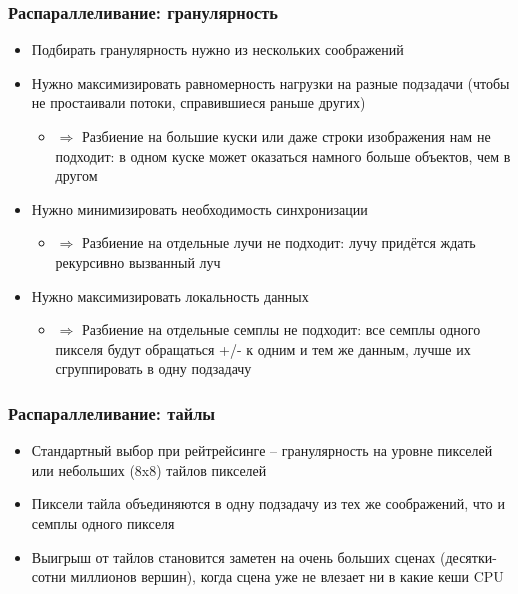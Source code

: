 \documentclass[10pt]{beamer}
\begin{document}
\begin{frame}[fragile]
\frametitle{Распараллеливание: гранулярность}
\begin{itemize}
\item Подбирать гранулярность нужно из нескольких соображений
\pause
\item Нужно максимизировать равномерность нагрузки на разные подзадачи (чтобы не простаивали потоки, справившиеся раньше других)
\pause
\begin{itemize}
\item \begin{math}\Longrightarrow\end{math} Разбиение на большие куски или даже строки изображения нам не подходит: в одном куске может оказаться намного больше объектов, чем в другом
\end{itemize}
\pause
\item Нужно минимизировать необходимость синхронизации
\pause
\begin{itemize}
\item \begin{math}\Longrightarrow\end{math} Разбиение на отдельные лучи не подходит: лучу придётся ждать рекурсивно вызванный луч
\end{itemize}
\pause
\item Нужно максимизировать локальность данных
\pause
\begin{itemize}
\item \begin{math}\Longrightarrow\end{math} Разбиение на отдельные семплы не подходит: все семплы одного пикселя будут обращаться +/- к одним и тем же данным, лучше их сгруппировать в одну подзадачу
\end{itemize}
\end{itemize}
\end{frame}

\begin{frame}[fragile]
\frametitle{Распараллеливание: тайлы}
\begin{itemize}
\item Стандартный выбор при рейтрейсинге -- гранулярность на уровне пикселей или небольших (8x8) тайлов пикселей
\pause
\item Пиксели тайла объединяются в одну подзадачу из тех же соображений, что и семплы одного пикселя
\pause
\item Выигрыш от тайлов становится заметен на очень больших сценах (десятки-сотни миллионов вершин), когда сцена уже не влезает ни в какие кеши CPU
\end{itemize}
\end{frame}
\end{document}
